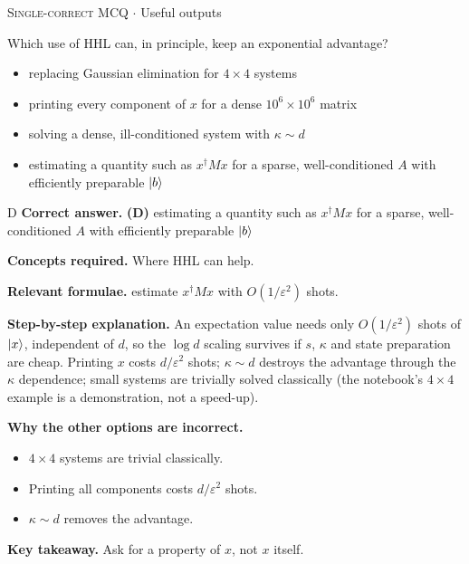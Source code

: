 \documentclass[11pt,a4paper]{article}
\newcommand{\optlabel}[1]{\textbf{(#1)}}
\newcommand{\correctlabel}[1]{\textcolor{okgreen}{\textbf{(#1)}\,\ding{51}}}
\newenvironment{qitem}[1]{\begin{list}{}{\setlength{\leftmargin}{3.3em}\setlength{\labelwidth}{3.1em}%
  \setlength{\labelsep}{0.2em}\setlength{\topsep}{3pt}\setlength{\parsep}{3pt}}\item[\textbf{Q.#1}\hfill]}{\end{list}}
\newcommand{\qsep}{\par\vspace{2pt}{\color{black!15}\hrule}\vspace{4pt}}
\newcommand{\qmeta}[2]{{\footnotesize\color{black!60}\textsc{#1} \;$\cdot$\; #2}\par}
\begin{document}
\begin{qitem}{78}
\qmeta{Single-correct MCQ}{Useful outputs}
Which use of HHL can, in principle, keep an exponential advantage?
\begin{itemize}[leftmargin=2.6em, labelsep=0.4em, itemsep=2pt, topsep=3pt]
\item[\optlabel{A}] replacing Gaussian elimination for $4\times4$ systems
\item[\optlabel{B}] printing every component of $x$ for a dense $10^6\times10^6$ matrix
\item[\optlabel{C}] solving a dense, ill-conditioned system with $\kappa \sim d$
\item[\correctlabel{D}] estimating a quantity such as $x^\dagger Mx$ for a sparse, well-conditioned $A$ with efficiently preparable $\ket b$
\end{itemize}
\end{qitem}
\begin{solbox}{D}
\textbf{\color{brand}Correct answer.} \textcolor{okgreen}{\textbf{(D)}} estimating a quantity such as $x^\dagger Mx$ for a sparse, well-conditioned $A$ with efficiently preparable $\ket b$

\textbf{\color{brand}Concepts required.} Where HHL can help.

\textbf{\color{brand}Relevant formulae.} estimate $x^\dagger Mx$ with $O(1/\varepsilon^2)$ shots.

\textbf{\color{brand}Step-by-step explanation.} An expectation value needs only $O(1/\varepsilon^2)$ shots of $\ket x$, independent of $d$, so the $\log d$ scaling survives if $s$, $\kappa$ and state preparation are cheap. Printing $x$ costs $d/\varepsilon^2$ shots;
$\kappa \sim d$ destroys the advantage through the $\kappa$ dependence; small systems are trivially solved classically (the notebook's $4\times4$ example is a demonstration, not a speed-up).

\textbf{\color{brand}Why the other options are incorrect.}
\begin{itemize}[leftmargin=2.4em, itemsep=1pt, topsep=2pt]
\item[\textbf{(A)}] $4\times4$ systems are trivial classically.
\item[\textbf{(B)}] Printing all components costs $d/\varepsilon^2$ shots.
\item[\textbf{(C)}] $\kappa \sim d$ removes the advantage.
\end{itemize}
\textbf{\color{brand}Key takeaway.} Ask for a property of $x$, not $x$ itself.
\end{solbox}
\qsep
\end{document}
